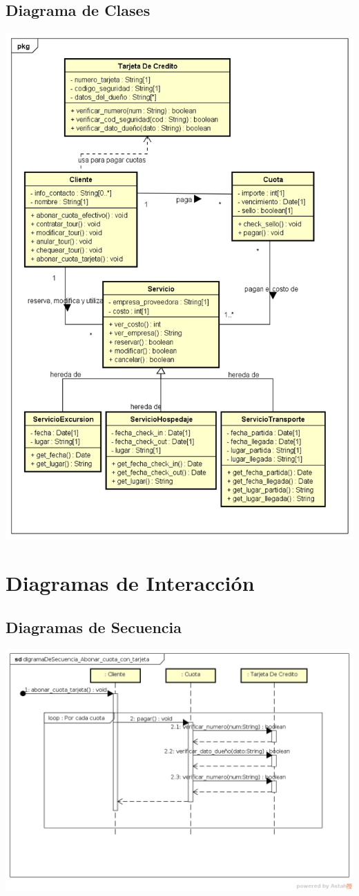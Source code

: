 \documentclass[12pt,a4paper]{article}
\begin{document}
	\subsection{Diagrama de Clases}
		\includegraphics[scale=0.7]{diagramaDeClases.png}

\section{Diagramas de Interacción}
	\subsection{Diagramas de Secuencia}
		\includegraphics[scale=0.6]{digramaDeSecuencia_Abonar_cuota_con_tarjeta.png}
\end{document}
